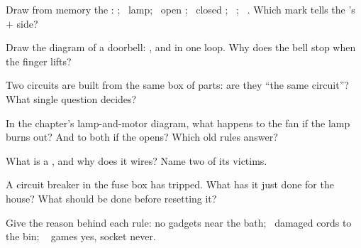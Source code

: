 \begin{exercise}[$\star$]\label{exo:g6:circuits-and-safety:2}
Draw from memory the : ; \ lamp; \ open ; \
closed ; \ ; \ . Which mark tells the 's
$+$ side?
\end{exercise}

\begin{exercise}[$\star$]\label{exo:g6:circuits-and-safety:3}
Draw the diagram of a doorbell: ,  and  in
one loop. Why does the bell stop when the finger lifts?
\end{exercise}

\begin{exercise}[$\star$]\label{exo:g6:circuits-and-safety:4}
Two circuits are built from the same box of parts: are they
``the same circuit''? What single question decides?
\end{exercise}

\begin{exercise}[$\star$]\label{exo:g6:circuits-and-safety:5}
In the chapter's lamp-and-motor diagram, what happens to the fan
if the lamp burns out? And to both if the  opens? Which old
rules answer?
\end{exercise}

\begin{exercise}[$\star$]\label{exo:g6:circuits-and-safety:6}
What is a , and why does it  wires? Name two of
its victims.
\end{exercise}

\begin{exercise}[$\star$]\label{exo:g6:circuits-and-safety:7}
A circuit breaker in the fuse box has tripped. What has it just
done for the house? What should be done before resetting it?
\end{exercise}

\begin{exercise}[$\star$]\label{exo:g6:circuits-and-safety:8}
Give the reason behind each rule: no gadgets near the bath; \
damaged cords to the bin; \  games yes, socket never.
\end{exercise}

